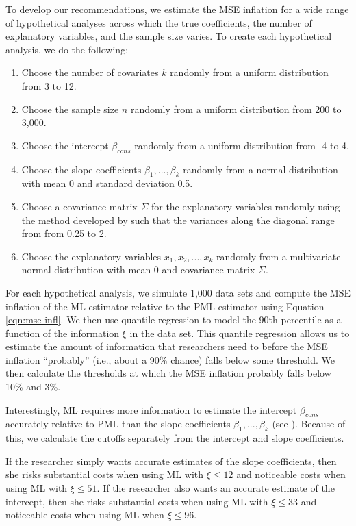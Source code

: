 \documentclass[12pt]{article}
\begin{document}
To develop our recommendations, we estimate the MSE inflation for a wide range of hypothetical analyses across which the true coefficients, the number of explanatory variables, and the sample size varies. 
To create each hypothetical analysis, we do the following:
\begin{enumerate}
\item Choose the number of covariates $k$ randomly from a uniform distribution from 3 to 12.
\item Choose the sample size $n$ randomly from a uniform distribution from 200 to 3,000.
\item Choose the intercept $\beta_{cons}$ randomly from a uniform distribution from -4 to 4.
\item Choose the slope coefficients $\beta_1,...,\beta_k$ randomly from a normal distribution with mean 0 and standard deviation 0.5.
\item Choose a covariance matrix $\Sigma$ for the explanatory variables randomly using the method developed by \cite{Joe2006} such that the variances along the diagonal range from from 0.25 to 2.
\item Choose the explanatory variables $x_1, x_2,...,x_k$ randomly from a multivariate normal distribution with mean 0 and covariance matrix $\Sigma$. 
\end{enumerate}
For each hypothetical analysis, we simulate 1,000 data sets and compute the MSE inflation of the ML estimator relative to the PML estimator using Equation \ref{eqn:mse-infl}.
We then use quantile regression to model the 90th percentile as a function of the information $\xi$ in the data set.
This quantile regression allows us to estimate the amount of information that researchers need to before the MSE inflation ``probably'' (i.e., about a 90\% chance) falls below some threshold.
We then calculate the thresholds at which the MSE inflation probably falls below 10\% and 3\%.

Interestingly, ML requires more information to estimate the intercept $\beta_{cons}$ accurately relative to PML than the slope coefficients $\beta_1,..., \beta_k$ (see \citealt{KingZeng2001}).
Because of this, we calculate the cutoffs separately from the intercept and slope coefficients.

If the researcher simply wants accurate estimates of the slope coefficients, then she risks substantial costs when using ML with $\xi \leq 12$ and noticeable costs when using ML with $\xi \leq 51$. If the researcher also wants an accurate estimate of the intercept, then she risks substantial costs when using ML with $\xi \leq 33$ and noticeable costs when using ML when $\xi \leq 96$. 
\end{document}
